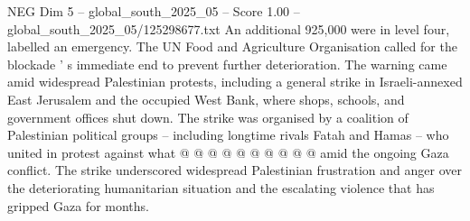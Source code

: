 \begin{textsample}{NEG Dim 5 – global\_south\_2025\_05 – Score 1.00 – global\_south\_2025\_05/125298677.txt}
An additional 925,000 were in level four, labelled an emergency.
The UN Food and Agriculture Organisation called for the blockade ' s immediate end to prevent further deterioration.
The warning came amid widespread Palestinian protests, including a general strike in Israeli-annexed East Jerusalem and the occupied West Bank, where shops, schools, and government offices shut down.
The strike was organised by a coalition of Palestinian political groups -- including longtime rivals Fatah and Hamas -- who united in protest against what @ @ @ @ @ @ @ @ @ @ amid the ongoing Gaza conflict.
The strike underscored widespread Palestinian frustration and anger over the deteriorating humanitarian situation and the escalating violence that has gripped Gaza for months.

\end{textsample}
